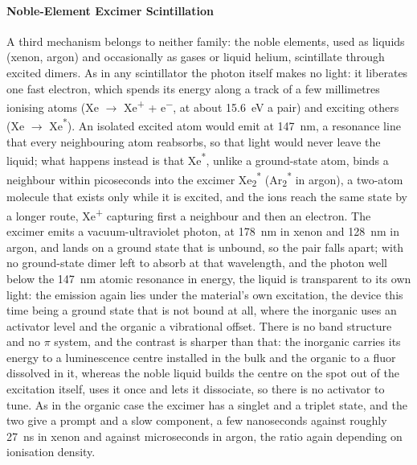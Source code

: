 \paragraph{Noble-Element Excimer Scintillation}
A third mechanism belongs to neither family: the noble elements, used as liquids (xenon, argon) and occasionally as gases or liquid helium, scintillate through excited dimers.
As in any scintillator the  photon itself makes no light: it liberates one fast electron, which spends its energy along a track of a few millimetres ionising atoms (Xe $\rightarrow$ Xe\textsuperscript{+} + e\textsuperscript{$-$}, at about \qty{15.6}{\electronvolt} a pair) and exciting others (Xe $\rightarrow$ Xe\textsuperscript{*}).
An isolated excited atom would emit at \qty{147}{\nano\metre}, a resonance line that every neighbouring atom reabsorbs, so that light would never leave the liquid; what happens instead is that Xe\textsuperscript{*}, unlike a ground-state atom, binds a neighbour within picoseconds into the excimer Xe\textsubscript{2}\textsuperscript{*} (Ar\textsubscript{2}\textsuperscript{*} in argon), a two-atom molecule that exists only while it is excited, and the ions reach the same state by a longer route, Xe\textsuperscript{+} capturing first a neighbour and then an electron.
The excimer emits a vacuum-ultraviolet photon, at \qty{178}{\nano\metre} in xenon and \qty{128}{\nano\metre} in argon, and lands on a ground state that is unbound, so the pair falls apart; with no ground-state dimer left to absorb at that wavelength, and the photon well below the \qty{147}{\nano\metre} atomic resonance in energy, the liquid is transparent to its own light: the emission again lies under the material's own excitation, the device this time being a ground state that is not bound at all, where the inorganic uses an activator level and the organic a vibrational offset.
There is no band structure and no $\pi$ system, and the contrast is sharper than that: the inorganic carries its energy to a luminescence centre installed in the bulk and the organic to a fluor dissolved in it, whereas the noble liquid builds the centre on the spot out of the excitation itself, uses it once and lets it dissociate, so there is no activator to tune.
As in the organic case the excimer has a singlet and a triplet state, and the two give a prompt and a slow component, a few nanoseconds against roughly \qty{27}{\nano\second} in xenon and against microseconds in argon, the ratio again depending on ionisation density.

